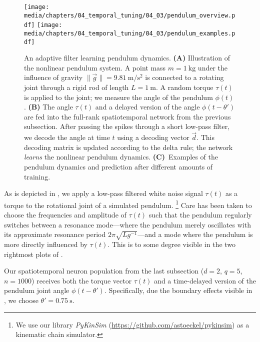 \begin{figure}
	\centering
	\texttt{[image: media/chapters/04\_temporal\_tuning/04\_03/pendulum\_overview.pdf]}
	\texttt{[image: media/chapters/04\_temporal\_tuning/04\_03/pendulum\_examples.pdf]}%
	{\label{fig:pendulum_overview_a}}%
	{\label{fig:pendulum_overview_b}}%
	{\label{fig:pendulum_overview_c}}%
	\caption[An adaptive filter learning pendulum dynamics]{
		An adaptive filter learning pendulum dynamics.
		\textbf{(A)} Illustration of the nonlinear pendulum system.
		A point mass $m = \SI{1}{\kilogram}$ under the influence of gravity $\| \vec g \| = \SI{9.81}{\metre\per\square\second}$ is connected to a rotating joint through a rigid rod of length $L = \SI{1}{\metre}$.
		A random torque $\tau(t)$ is applied to the joint; we measure the angle of the pendulum $\phi(t)$.
		\textbf{(B)} The angle $\tau(t)$ and a delayed version of the angle $\phi(t - \theta')$ are fed into the full-rank spatiotemporal \NEF network from the previous subsection.
		After passing the spikes through a short low-pass filter, we decode the angle at time $t$ using a decoding vector $\vec d$.
		This decoding matrix is updated according to the delta rule; the network \emph{learns} the nonlinear pendulum dynamics.
		\textbf{(C)}~Examples of the pendulum dynamics and prediction after different amounts of training.
	}
	\label{fig:pendulum_overview}
\end{figure}
As is depicted in , we apply a low-pass filtered white noise signal $\tau(t)$ as a torque to the rotational joint of a simulated pendulum.%
\footnote{We use our library \emph{PyKinSim} (\url{https://github.com/astoeckel/pykinsim}) as a kinematic chain simulator.}
Care has been taken to choose the frequencies and amplitude of $\tau(t)$ such that the pendulum regularly switches between a resonance mode---where the pendulum merely oscillates with its approximate resonance period $2 \pi \sqrt{L g^{-1}}$---and a mode where the pendulum is more directly influenced by $\tau(t)$.
This is to some degree visible in the two rightmost plots of .

Our spatiotemporal neuron population from the last subsection ($d = 2$, $q = 5$, $n = 1000$) receives both the torque vector $\tau(t)$ and a time-delayed version of the pendulum joint angle $\phi(t - \theta')$.
Specifically, due the boundary effects visible in , we choose $\theta' = \SI{0.75}{\second}$.

\pagebreak

